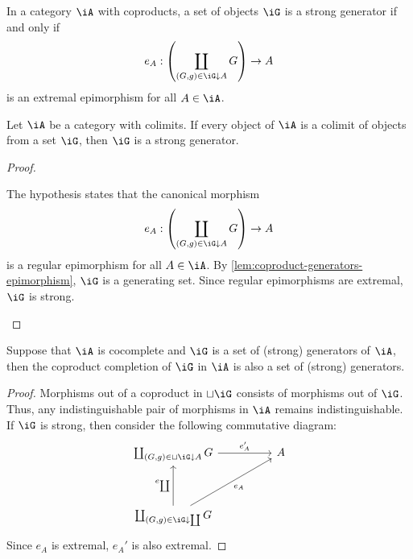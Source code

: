 \documentclass{zett}
\begin{document}
\begin{defn}
  In a category $\iA$ with coproducts, a set of objects $\iG$ is a strong generator if and only if
  \[
    e_{A} : \left(\coprod_{(G, g) \in \iG \dn A} G\right) \to A
  \]
  is an extremal epimorphism for all $A \in \iA$.
\end{defn}

\begin{cor}\label{cor:colimits-strong-generators}
  Let $\iA$ be a category with colimits.
  If every object of $\iA$ is a colimit of objects from a set $\iG$, then $\iG$ is a strong generator.
\end{cor}
\begin{proof}
  \begin{node}
    The hypothesis states that the canonical morphism
    \[
      e_{A} : \left(\coprod_{(G, g) \in \iG \dn A} G\right) \to A
    \]
    is a regular epimorphism for all $A \in \iA$.
    By \cref{lem:coproduct-generators-epimorphism}, $\iG$ is a generating set.
    Since regular epimorphisms are extremal, $\iG$ is strong.
  \end{node}
\end{proof}

\begin{lem}\label{lem:coproduct-completion-generator}
  Suppose that $\iA$ is cocomplete and $\iG$ is a set of (strong) generators of $\iA$, then the coproduct completion of $\iG$ in $\iA$ is also a set of (strong) generators.
\end{lem}
\begin{proof}
  Morphisms out of a coproduct in $\sqcup\iG$ consists of morphisms out of $\iG$.
  Thus, any indistinguishable pair of morphisms in $\iA$ remains indistinguishable.
  If $\iG$ is strong, then consider the following commutative diagram:
  \[
    \begin{tikzcd}
      {\coprod_{(G,g) \in \sqcup\iG \dn A}G} && A \\
      \\
      {\coprod_{(G,g) \in \iG \dn \coprod}G}
      \arrow["{e_{A}'}", from=1-1, to=1-3]
      \arrow["{e_{A}}"', from=3-1, to=1-3]
      \arrow["{e_{\coprod}}", from=3-1, to=1-1]
    \end{tikzcd}
  \]
  Since $e_{A}$ is extremal, $e_{A}'$ is also extremal.
\end{proof}
\end{document}
